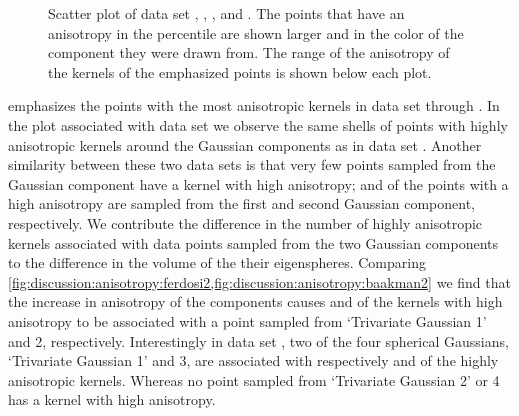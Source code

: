 \begin{figure}
\begin{subfigure}{0.23\textwidth}
				\caption{}
				\label{fig:discussion:anisotropy:baakman3}
			\end{subfigure}			
			\caption{Scatter plot of data set
				 \ferdosiTwo, %
				 \baakmanTwo, %
				 \ferdosiThree, and %
				 \baakmanThree. %
				The points that have an anisotropy in the  percentile are shown larger and in the color of the component they were drawn from. The range of the anisotropy of the kernels of the emphasized points is shown below each plot.}
			\label{fig:discussion:anisotropy:multisphere}
		\end{figure}			
		 emphasizes the points with the most anisotropic kernels in data set \ferdosiTwo through \baakmanThree. 
			In the plot associated with data set \ferdosiTwo we observe the same shells of points with highly anisotropic kernels around the Gaussian components as in data set \ferdosiOne. Another similarity between these two data sets is that very few points sampled from the Gaussian component have a kernel with high anisotropy;  and  of the points with a high anisotropy are sampled from the first and second Gaussian component, respectively. 
			We contribute the difference in the number of highly anisotropic kernels associated with data points sampled from the two Gaussian components to the difference in the volume of the their eigenspheres.
			Comparing \cref{fig:discussion:anisotropy:ferdosi2,fig:discussion:anisotropy:baakman2} we find that the increase in anisotropy of the components causes  and  of the kernels with high anisotropy to be associated with a point sampled from `Trivariate Gaussian 1' and 2, respectively. 
			Interestingly in data set \ferdosiThree, two of the four spherical Gaussians, `Trivariate Gaussian 1' and 3, are associated with respectively  and  of the highly anisotropic kernels. Whereas no point sampled from `Trivariate Gaussian 2' or 4 has a kernel with high anisotropy.
